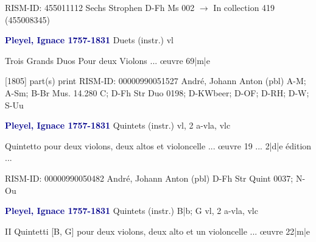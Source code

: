 \documentclass[twocolumn]{book}
\begin{document}
\newline RISM-ID: 455011112
\newline Sechs Strophen
\newline D-Fh  Ms 002
\newline $\rightarrow$ In collection 419 (455008345)

\newline \par \vspace{7pt} \textcolor{darkblue}{\textbf{Pleyel, Ignace  1757-1831}}
\newline Duets (instr.)    
 vl
\newline \begin{itshape}Trois Grands Duos Pour deux Violons ... œuvre 69|m|e\end{itshape} 
\newline \textcolor{darkblue}{}  [1805]  part(s)  
\newline print
\newline RISM-ID: 00000990051527
\newline André, Johann Anton  (pbl)
\newline A-M; A-Sm; B-Br  Mus. 14.280 C; D-Fh  Str Duo 0198; D-KWbeer; D-OF; D-RH; D-W; S-Uu
\newline \par \vspace{7pt} \textcolor{darkblue}{\textbf{Pleyel, Ignace  1757-1831}}
\newline Quintets (instr.)    
 vl, 2 a-vla, vlc
\newline \begin{itshape}Quintetto pour deux violons, deux altos et violoncelle ... œuvre 19 ... 2|d|e édition ...\end{itshape} 
\newline RISM-ID: 00000990050482
\newline André, Johann Anton  (pbl)
\newline D-Fh  Str Quint 0037; N-Ou
\newline \par \vspace{7pt} \textcolor{darkblue}{\textbf{Pleyel, Ignace  1757-1831}}
\newline Quintets (instr.)  B|b; G  
 vl, 2 a-vla, vlc
\newline \begin{itshape}II Quintetti [B, G] pour deux violons, deux alto et un violoncelle ... œuvre 22|m|e\end{itshape} 
\end{document}
